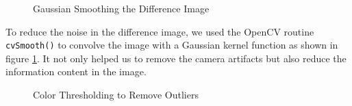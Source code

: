 \begin{figure}[ht!]
\centering
{} \quad
{} \hfill
\caption{Gaussian Smoothing the Difference Image}
\label{figure:gauss}
\end{figure}

To reduce the noise in the difference image, we used the OpenCV
routine \texttt{cvSmooth()} to convolve the image with a Gaussian kernel
function as shown in figure \ref{figure:gauss}. It not only helped us to
remove the camera artifacts but also reduce the information content in the
image.

\begin{figure}[ht!]
\centering
{} \quad
{} \hfill
\caption{Color Thresholding to Remove Outliers}
\label{figure:color-thres}
\end{figure}

